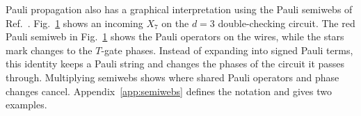 \begin{semiwebaddition}
Pauli propagation also has a graphical interpretation using the Pauli
semiwebs of Ref.~\cite{zxflow}. Fig.~\ref{fig:semiweb-main} shows an
incoming $X_7$ on the $d=3$ double-checking circuit. The red Pauli semiweb in
Fig.~\ref{fig:semiweb-main} shows the Pauli operators on the wires, while the stars mark changes to the $T$-gate phases.
Instead of expanding into signed Pauli terms, this identity keeps a
Pauli string and changes the phases of the circuit it passes through.
Multiplying semiwebs shows where shared Pauli operators and phase changes
cancel. Appendix~\ref{app:semiwebs} defines the notation and gives two
examples.
\end{semiwebaddition}

\begin{figure}[t]
\centering
{}
\label{fig:semiweb-main}
\end{figure}
